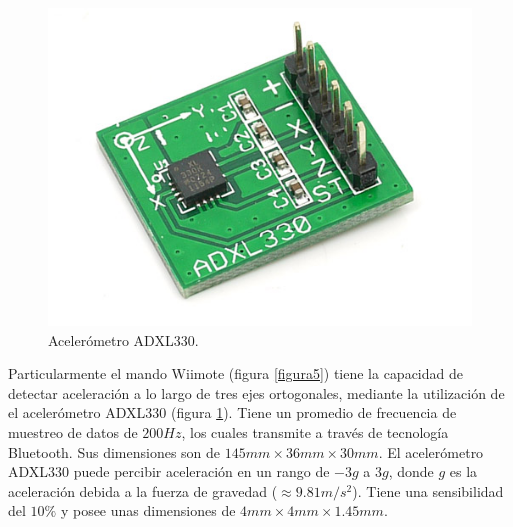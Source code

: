 \begin{figure}[H]
\centering
\includegraphics[scale=0.45]{adxl330v1101.jpg}
\caption[Caption for LOF]{Acelerómetro ADXL330\footnotemark[1].}
\label{figura4}
\end{figure}

Particularmente el mando Wiimote (figura \ref{figura5}) tiene la capacidad de detectar aceleración a lo largo de tres ejes ortogonales, mediante la utilización de el acelerómetro ADXL330 (figura \ref{figura4}). 
Tiene un promedio de frecuencia de muestreo de datos de $200Hz$, los cuales transmite a través de tecnología Bluetooth. 
Sus dimensiones son de $145mm \times 36mm \times 30mm$.
El acelerómetro ADXL330 puede percibir aceleración en un rango de $-3g$ a $3g$, donde $g$ es la aceleración debida a la fuerza de gravedad ($\approx {9.81m/s^{2}}$). 
Tiene una sensibilidad del $10\%$ y posee unas dimensiones de $4mm \times 4mm \times 1.45mm$.\\

